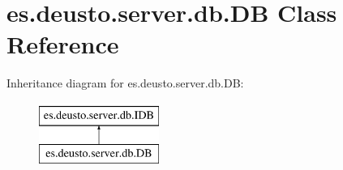 \hypertarget{classes_1_1deusto_1_1server_1_1db_1_1_d_b}{}\section{es.\+deusto.\+server.\+db.\+DB Class Reference}
\label{classes_1_1deusto_1_1server_1_1db_1_1_d_b}
Inheritance diagram for es.\+deusto.\+server.\+db.\+DB\+:\begin{figure}[H]
\begin{center}
\leavevmode
\includegraphics[height=2.000000cm]{classes_1_1deusto_1_1server_1_1db_1_1_d_b}
\end{center}
\end{figure}
